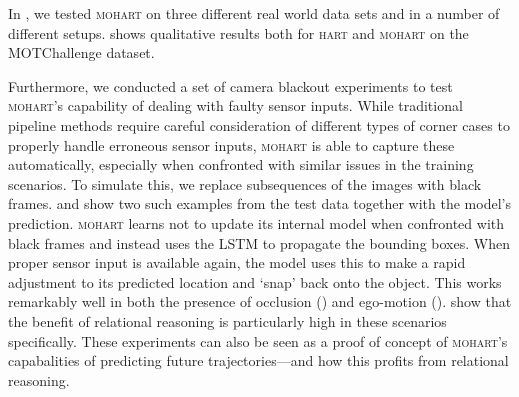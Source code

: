 
In , we tested \textsc{mohart} on three different real world data sets and in a number of different setups.  shows qualitative results both for \textsc{hart} and \textsc{mohart} on the MOTChallenge dataset.

Furthermore, we conducted a set of camera blackout experiments to test \textsc{mohart}'s capability of dealing with faulty sensor inputs. While traditional pipeline methods require careful consideration of different types of corner cases to properly handle erroneous sensor inputs, \textsc{mohart} is able to capture these automatically, especially when confronted with similar issues in the training scenarios. To simulate this, we replace subsequences of the images with black frames.  and  show two such examples from the test data together with the model's prediction. \textsc{mohart} learns not to update its internal model when confronted with black frames and instead uses the LSTM to propagate the bounding boxes. When proper sensor input is available again, the model uses this to make a rapid adjustment to its predicted location and `snap' back onto the object. This works remarkably well in both the presence of occlusion () and ego-motion ().  show that the benefit of relational reasoning is particularly high in these scenarios specifically. These experiments can also be seen as a proof of concept of \textsc{mohart}'s capabalities of predicting future trajectories---and how this profits from relational reasoning.